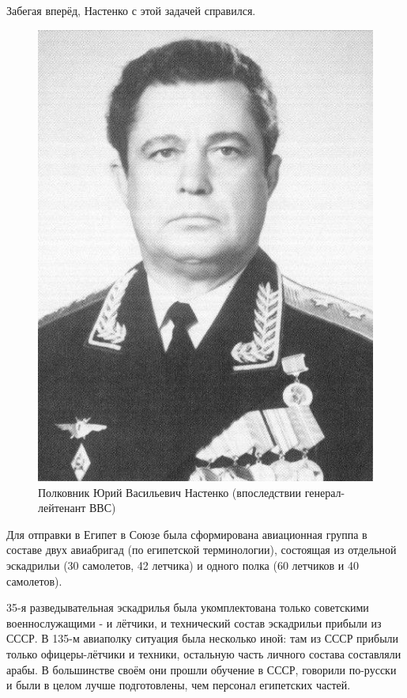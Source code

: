 Забегая вперёд, Настенко с этой задачей справился.

\begin{figure}[h!tb] 
	\centering\includegraphics[scale=0.4]{Dolina_1/a9-qXqEZvKU.jpg}
	\caption{Полковник Юрий Васильевич Настенко (впоследствии генерал-лейтенант ВВС)}%
\end{figure}

Для отправки в Египет в Союзе была сформирована авиационная группа в составе двух авиабригад (по египетской терминологии), состоящая из отдельной эскадрильи (30 самолетов, 42 летчика) и одного полка (60 летчиков и 40 самолетов).

35-я разведывательная эскадрилья была укомплектована только советскими военнослужащими - и лётчики, и технический состав эскадрильи прибыли из СССР. В 135-м авиаполку ситуация была несколько иной: там из СССР прибыли только офицеры-лётчики и техники, остальную часть личного состава составляли арабы. В большинстве своём они прошли обучение в СССР, говорили по-русски и были в целом лучше подготовлены, чем персонал египетских частей.

